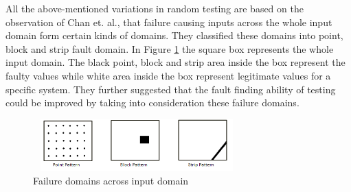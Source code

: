 All the above-mentioned variations in random testing are based on the observation of Chan et. al.,  \cite{Chan1996} that failure causing inputs across the whole input domain form certain kinds of domains. They classified these domains into point, block and strip fault domain. In Figure \ref{fig:patterns} the square box represents the whole input domain. The black point, block and strip area inside the box represent the faulty values while white area inside the box represent legitimate values for a specific system. They further suggested that the fault finding ability of testing could be improved by taking into consideration these failure domains.

\begin{figure}[h]
 \centering
\includegraphics[width=8cm,height=2cm]{chapter4/ART_Patterns.png}
\caption{Failure domains across input domain \cite{Chan1996}}
\label{fig:patterns}
\end{figure}






